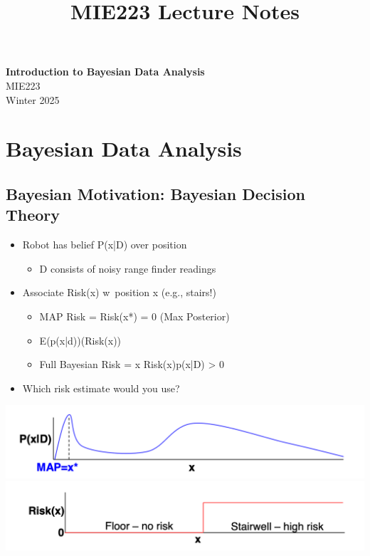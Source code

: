 \documentclass[11pt]{article}
\theoremstyle{definition}
\begin{document}
\setcounter{section}{0}
\title{MIE223 Lecture Notes}

\thispagestyle{empty}

\begin{center}
{\LARGE \bf Introduction to Bayesian Data Analysis}\\
{\large MIE223}\\
Winter 2025
\end{center}
\section{Bayesian Data Analysis}

\subsection{Bayesian Motivation: Bayesian Decision Theory}
\begin{itemize}
    \item Robot has belief P(x|D) over position
    \begin{itemize}
        \item D consists of noisy range finder readings
    \end{itemize}
    \item Associate Risk(x) w\ position x (e.g., stairs!)
    \begin{itemize}
        \item MAP Risk = Risk(x*) = 0 (Max Posterior)
        \item E(p(x|d))(Risk(x))
        \item Full Bayesian Risk = x Risk(x)p(x|D) > 0
    \end{itemize}
    \item Which risk estimate would you use?
\end{itemize}

\includegraphics[width=\textwidth/2-2.08049pt]{1.png}
\includegraphics[width=\textwidth/2]{2.png}
\end{document}
